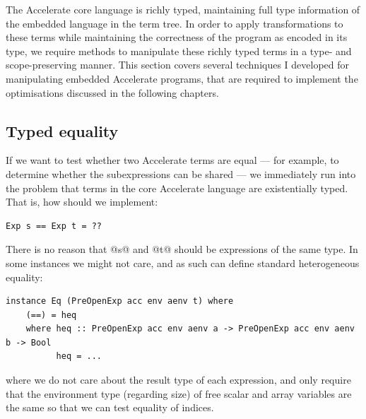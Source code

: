 
The Accelerate core language is richly typed, maintaining full type information
of the embedded language in the term tree. In order to apply transformations to
these terms while maintaining the correctness of the program as encoded in its
type, we require methods to manipulate these richly typed terms in a type- and
scope-preserving manner. This section covers several techniques I developed for
manipulating embedded Accelerate programs, that are required to implement the
optimisations discussed in the following chapters.


\subsection{Typed equality}
\label{sec:equality}

If we want to test whether two Accelerate terms are equal --- for example, to
determine whether the subexpressions can be shared --- we immediately run into
the problem that terms in the core Accelerate language are existentially typed.
That is, how should we implement:
%
\begin{lstlisting}[style=haskell]
Exp s == Exp t = ??
\end{lstlisting}
%
There is no reason that @s@ and @t@ should be expressions of the same
type. In some instances we might not care, and as such can define standard
heterogeneous equality:
%
\begin{lstlisting}[style=haskell]
instance Eq (PreOpenExp acc env aenv t) where
    (==) = heq
    where heq :: PreOpenExp acc env aenv a -> PreOpenExp acc env aenv b -> Bool
          heq = ...
\end{lstlisting}
%
where we do not care about the result type of each expression, and only require
that the environment type (regarding size) of free scalar and array variables
are the same so that we can test equality of  indices.

